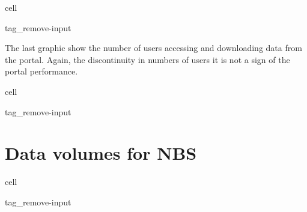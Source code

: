\documentclass[letterpaper,10pt,english]{jupyterBook}
\begin{document}
\begin{sphinxuseclass}{cell}
\begin{sphinxuseclass}{tag_remove-input}
\end{sphinxuseclass}
\end{sphinxuseclass}
\sphinxAtStartPar
The last graphic show the number of users accessing and downloading data from the portal. Again, the discontinuity in numbers of users it is not a sign of the portal performance.

\begin{sphinxuseclass}{cell}
\begin{sphinxuseclass}{tag_remove-input}
\end{sphinxuseclass}
\end{sphinxuseclass}
\sphinxstepscope


\chapter{Data volumes for NBS}
\label{\detokenize{volumes:data-volumes-for-nbs}}\label{\detokenize{volumes::doc}}
\begin{sphinxuseclass}{cell}
\begin{sphinxuseclass}{tag_remove-input}
\end{sphinxuseclass}
\end{sphinxuseclass}
\end{document}
